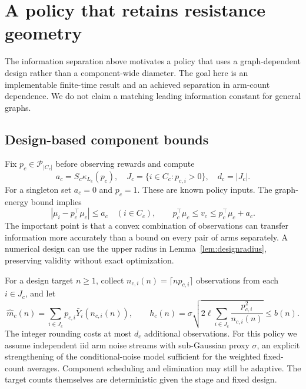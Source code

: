 \section{A policy that retains resistance geometry}
The information separation above motivates a policy that uses a graph-dependent design rather than a component-wide diameter. The goal here is an implementable finite-time result and an achieved separation in arm-count dependence. We do not claim a matching leading information constant for general graphs.

\subsection{Design-based component bounds}
Fix $p_c\in\mathscr P_{|C_c|}$ before observing rewards and compute
\begin{equation}
 a_c=S_c\kappa_{L_c}(p_c),\quad
 J_c=\{i\in C_c:p_{c,i}>0\},\quad d_c=|J_c|.
 \label{eq:designbias}
\end{equation}
For a singleton set $a_c=0$ and $p_c=1$. These are known policy inputs. The graph-energy bound implies
\begin{equation}
 |\mu_i-p_c^\top\mu_c|\le a_c\quad(i\in C_c),\qquad
 p_c^\top\mu_c\le v_c\le p_c^\top\mu_c+a_c.
 \label{eq:designtransfer}
\end{equation}
The important point is that a convex combination of observations can transfer information more accurately than a bound on every pair of arms separately. A numerical design can use the upper radius in Lemma~\ref{lem:designradius}, preserving validity without exact optimization.

For a design target $n\ge1$, collect
$n_{c,i}(n)=\lceil np_{c,i}\rceil$ observations from each $i\in J_c$, and let
\begin{equation}
 \widehat m_c(n)=\sum_{i\in J_c}p_{c,i}\bar Y_i(n_{c,i}(n)),\qquad
 h_c(n)=\sigma\sqrt{2\ell\sum_{i\in J_c}
                     \frac{p_{c,i}^2}{n_{c,i}(n)}}\le b(n).
 \label{eq:designestimate}
\end{equation}
The integer rounding costs at most $d_c$ additional observations. For this policy we assume independent iid arm noise streams with sub-Gaussian proxy $\sigma$, an explicit strengthening of the conditional-noise model sufficient for the weighted fixed-count averages. Component scheduling and elimination may still be adaptive. The target counts themselves are deterministic given the stage and fixed design.


